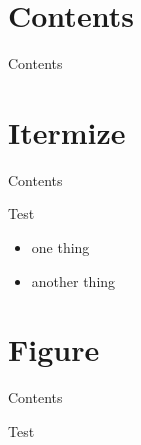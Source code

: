 

\begin{frame}
  \maketitle
\end{frame}

\section*{Contents}

\begin{frame}{Contents}
  \tableofcontents
\end{frame}

\section{Itermize}

\begin{frame}{Contents}
  \tableofcontents[currentsection]
\end{frame}

\begin{frame}{Test}
  \begin{itemize}
  \item one thing
  \item another thing
  \end{itemize}
\end{frame}

\section{Figure}

\begin{frame}{Contents}
  \tableofcontents[currentsection]
\end{frame}

\begin{frame}{Test}
\end{frame}


\appendix


\endinput
